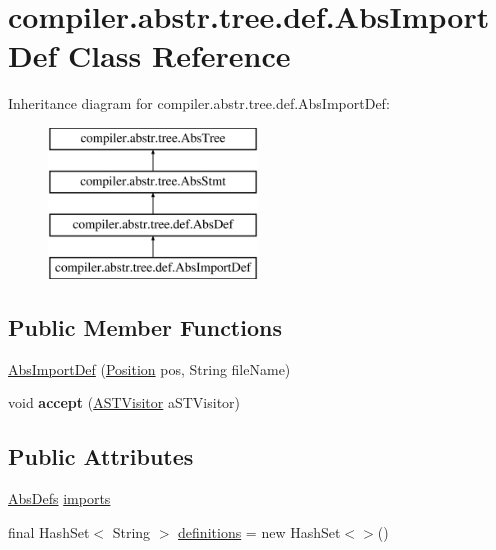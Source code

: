 \hypertarget{classcompiler_1_1abstr_1_1tree_1_1def_1_1_abs_import_def}{}\section{compiler.\+abstr.\+tree.\+def.\+Abs\+Import\+Def Class Reference}
\label{classcompiler_1_1abstr_1_1tree_1_1def_1_1_abs_import_def}
Inheritance diagram for compiler.\+abstr.\+tree.\+def.\+Abs\+Import\+Def\+:\begin{figure}[H]
\begin{center}
\leavevmode
\includegraphics[height=4.000000cm]{classcompiler_1_1abstr_1_1tree_1_1def_1_1_abs_import_def}
\end{center}
\end{figure}
\subsection*{Public Member Functions}
\begin{DoxyCompactItemize}
\item 
\hyperlink{classcompiler_1_1abstr_1_1tree_1_1def_1_1_abs_import_def_abf2b8dbe186710c436013804de4fc345}{Abs\+Import\+Def} (\hyperlink{classcompiler_1_1_position}{Position} pos, String file\+Name)
\item 
\mbox{\label{classcompiler_1_1abstr_1_1tree_1_1def_1_1_abs_import_def_a99cf17ccd2b7f9599ba6ceb388c7c625}} 
void {\bfseries accept} (\hyperlink{interfacecompiler_1_1abstr_1_1_a_s_t_visitor}{A\+S\+T\+Visitor} a\+S\+T\+Visitor)
\end{DoxyCompactItemize}
\subsection*{Public Attributes}
\begin{DoxyCompactItemize}
\item 
\hyperlink{classcompiler_1_1abstr_1_1tree_1_1_abs_defs}{Abs\+Defs} \hyperlink{classcompiler_1_1abstr_1_1tree_1_1def_1_1_abs_import_def_af96bd2823562fa654426c02d7e704c02}{imports}
\item 
final Hash\+Set$<$ String $>$ \hyperlink{classcompiler_1_1abstr_1_1tree_1_1def_1_1_abs_import_def_ad3f8e504d27647b261b1ff030419ba24}{definitions} = new Hash\+Set$<$$>$()
\end{DoxyCompactItemize}

